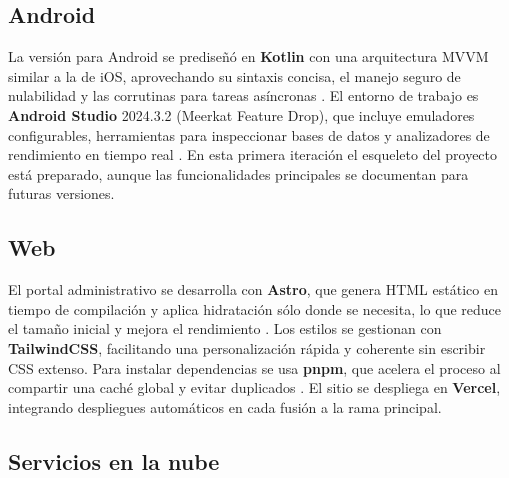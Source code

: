 \subsection{Android}

\begin{large}

La versión para Android se prediseñó en \textbf{Kotlin} con una arquitectura MVVM similar a la de iOS, aprovechando su sintaxis concisa, el manejo seguro de nulabilidad y las corrutinas para tareas asíncronas \cite{kotlin_lang2025}. El entorno de trabajo es \textbf{Android Studio} 2024.3.2 (Meerkat Feature Drop), que incluye emuladores configurables, herramientas para inspeccionar bases de datos y analizadores de rendimiento en tiempo real \cite{as2024_3_2}. En esta primera iteración el esqueleto del proyecto está preparado, aunque las funcionalidades principales se documentan para futuras versiones.

\end{large}

\subsection{Web}

\begin{large}

El portal administrativo se desarrolla con \textbf{Astro}, que genera HTML estático en tiempo de compilación y aplica hidratación sólo donde se necesita, lo que reduce el tamaño inicial y mejora el rendimiento \cite{astro_docs2025}. Los estilos se gestionan con \textbf{TailwindCSS}, facilitando una personalización rápida y coherente sin escribir CSS extenso. Para instalar dependencias se usa \textbf{pnpm}, que acelera el proceso al compartir una caché global y evitar duplicados \cite{pnpm_docs2025}. El sitio se despliega en \textbf{Vercel}, integrando despliegues automáticos en cada fusión a la rama principal.

\end{large}

\subsection{Servicios en la nube}

